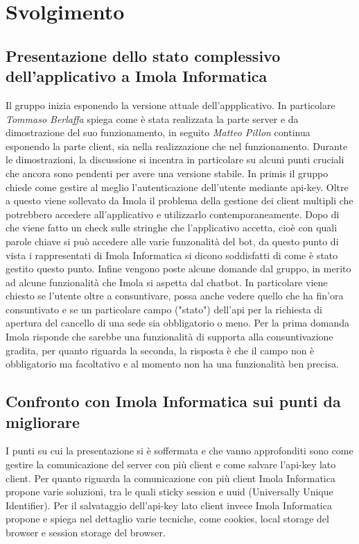 \section{Svolgimento}
\subsection{Presentazione dello stato complessivo dell'applicativo a Imola Informatica}
Il gruppo inizia esponendo la versione attuale dell'appplicativo. In particolare \textit{Tommaso Berlaffa} spiega come è stata realizzata la parte server e da dimostrazione del suo funzionamento, in seguito \textit{Matteo Pillon} continua esponendo la parte client, sia nella realizzazione che nel funzionamento.
Durante le dimostrazioni, la discussione si incentra in particolare su alcuni punti cruciali che ancora sono pendenti per avere una versione stabile. In primis il gruppo chiede come gestire al meglio l'autenticazione dell'utente mediante api-key. Oltre a questo viene sollevato da Imola il problema della gestione dei client multipli che potrebbero accedere all'applicativo e utilizzarlo contemporaneamente. Dopo di che viene fatto un check sulle stringhe che l'applicativo accetta, cioè con quali parole chiave si può accedere alle varie funzonalità del bot, da questo punto di vista i rappresentati di Imola Informatica si dicono soddisfatti di come è stato gestito questo punto. Infine vengono poste alcune domande dal gruppo, in merito ad alcune funzionalità che Imola si aspetta dal chatbot. In particolare viene chiesto se l'utente oltre a consuntivare, possa anche vedere quello che ha fin'ora consuntivato e se un particolare campo ("stato") dell'api per la richiesta di apertura del cancello di una sede sia obbligatorio o meno. Per la prima domanda Imola risponde che sarebbe una funzionalità di supporta alla consuntivazione gradita, per quanto riguarda la seconda, la risposta è che il campo non è obbligatorio ma facoltativo e al momento non ha una funzionalità ben precisa.
\subsection{Confronto con Imola Informatica sui punti da migliorare}
I punti su cui la presentazione si è soffermata e che vanno approfonditi sono come gestire la comunicazione del server con più client e come salvare l'api-key lato client. Per quanto riguarda la comunicazione con più client Imola Informatica propone varie soluzioni, tra le quali sticky session e uuid (Universally Unique Identifier). Per il salvataggio dell'api-key lato client invece Imola Informatica propone e spiega nel dettaglio varie tecniche, come cookies, local storage del browser e session storage del browser.